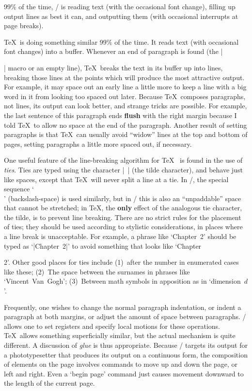 99\% of the time, \Troff/ is reading text (with the occasional
font change), filling up output lines as best it can, and outputting
them (with occasional interrupts at page breaks).

\TeX\ is doing
something similar 99\% of the time.  It reads text (with occasional
font changes) into a buffer.  Whenever an end of paragraph is found
(the |\par| macro or an empty line), \TeX\ breaks the text in its
buffer up into lines, breaking those lines at the points which
will produce the most attractive output.  For example,
it may space out an
early line a little more to keep a line with a big word
in it from looking too spaced out later.
Because \TeX\ composes paragraphs, not lines, its output can look
better, and strange tricks are possible.  For example,
the last sentence of this paragraph
ends {\bf flush} with the right margin because I told 
\TeX\ to allow no space at the end of the paragraph.  Another result
of setting paragraphs is that \TeX\ can usually avoid
``widow'' lines at the top and bottom of pages, setting paragraphs
a little more spaced out, if necessary.
{\parfillskip=0pt\par}
One useful feature of the line-breaking algorithm for \TeX\
is found in the use of {\sl ties\/}.  Ties
are typed using the character |~| (the tilde character), and
behave just like spaces, except that \TeX\ will never split a line
at a tie.
In \Troff/,
the special sequence `\\\]' (backslash-space) is used
similarly,
but in \Troff/ this is also an ``unpaddable'' space that
cannot be stretched; in \TeX, the {\bf only} effect of the analogous
tie character, the tilde, is to prevent
line breaking.
There are no strict rules for the placement of ties; they
should be used according to stylistic considerations, in places
where a line break is unacceptable.
For example, a phrase like `Chapter~2' should be typed as `|Chapter~2|'
to avoid something that looks like `Chapter
{\parfillskip=0pt\par\parskip=0pt\noindent}2'.  Other
good places for ties
include (1)~after the number
in enumerated cases like these; (2)~The space between the
surnames in phrases like `Vincent~Van~Gogh'; (3)~Between math symbols
in apposition as in `dimension~$d$'.

Frequently, one wishes to change the normal paragraph indentation,
or indent a paragraph at both margins, or adjust the amount of space
between paragraphs.  \Troff/ allows one to set registers
and specify local motions for these operations.
\TeX\ allows
something superficially similar, but the actual mechanism is
quite different.  A discussion of {\sl glue\/} is thus appropriate.
\SubSection{Boxes and Glue}
Because \Troff/ targets its output for a phototypesetter
that produces its output on a continuous form, the
composition of elements on the page involves commands to move
up and down the page, or left and right.  Even a `begin page'
command just causes movement downward to the length of the
current page.

